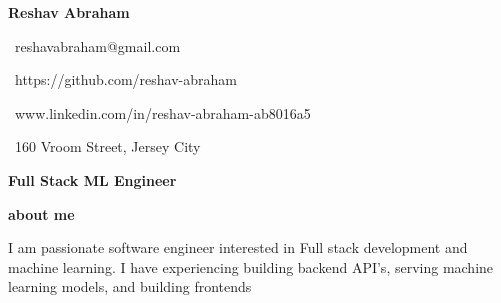 \documentclass{article}
\begin{document}
\Huge\vspace{1em}\hspace{-0.30em}\textbf{Reshav Abraham} 
    \begin{minipage}[t]{0.45\textwidth\vspace{0em}\hspace{3.3em}} 
        \small
        \faEnvelopeO \, reshavabraham@gmail.com
        
        \faGithub \, https://github.com/reshav-abraham 

        \faLinkedin \, www.linkedin.com/in/reshav-abraham-ab8016a5

        \faHome \, 160 Vroom Street, Jersey City
    \end{minipage}

\vspace{-1.1em}\Large\textbf{Full Stack ML Engineer} 

\vspace{0.5em}\hspace{0em}\small\textbf{about me} 

\begin{minipage}[t]{0.6\textwidth\hspace{0em}}
I am passionate software engineer interested in Full stack development
and machine learning. I have experiencing building backend API's, serving machine learning models, and building frontends \par
\end{minipage}

\vspace{1.3em}
\end{document}
